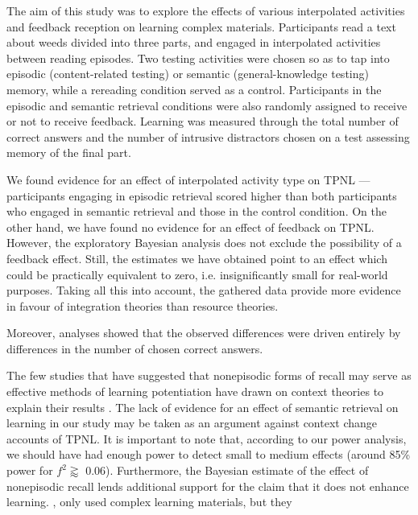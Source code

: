 \documentclass[../main.tex]{subfiles}
\begin{document}
The aim of this study was to explore the effects of various interpolated activities
and feedback reception on learning complex materials. Participants read a text
about weeds divided into three parts, and engaged in interpolated activities between
reading episodes. Two testing activities were chosen so as to tap into episodic 
(content-related testing) or semantic (general-knowledge testing) memory, while a 
rereading condition served as a control. Participants in the episodic and semantic
retrieval conditions were also randomly assigned to receive or not to receive 
feedback. Learning was measured through the total number of correct answers 
and the number of intrusive distractors chosen on a test assessing memory of the
final part.

We found evidence for an effect of interpolated activity type on TPNL --- participants 
engaging in episodic retrieval scored higher than both participants who engaged in 
semantic retrieval and those in the control condition. On the other hand, we
have found no evidence for an effect of feedback on TPNL. However, the
exploratory Bayesian analysis does not exclude the possibility of a feedback
effect. Still, the estimates we have obtained point to an effect which could be
practically equivalent to zero, i.e. insignificantly small for real-world
purposes. Taking all this into account, the gathered data provide more evidence in
favour of integration theories than resource theories. 

Moreover, analyses showed
that the observed differences were driven entirely by differences in the number of
chosen correct answers.


The few studies that have suggested that nonepisodic forms of recall may serve
as effective methods of learning potentiation have drawn on context theories to
explain their results \citep{divisRetrievalSpeedsContext2014, pastotterRetrievalLearningFacilitates2011}.
The lack of evidence for an effect of semantic retrieval on learning
in our study may be taken as an argument against context change accounts of
TPNL. It is important to note that, according to our power analysis, we should
have had enough power to detect small to medium effects (around 85\% power for
\(f^2 \gtrapprox\) 0.06). Furthermore, the Bayesian estimate of the effect of
nonepisodic recall lends additional support for the claim that it does not
enhance learning.
, only \cite{divisRetrievalSpeedsContext2014} used complex learning materials,
but they 
\end{document}
